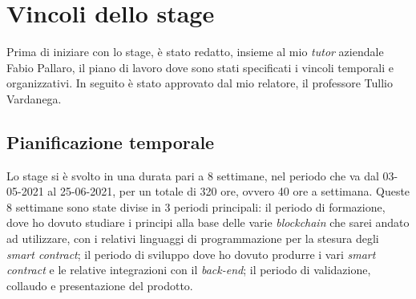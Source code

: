 
\section{Vincoli dello stage}
Prima di iniziare con lo stage, è stato redatto, insieme al mio \textit{tutor} aziendale Fabio Pallaro, il piano di lavoro dove sono stati specificati i vincoli temporali e organizzativi. In seguito è stato approvato dal mio relatore, il professore Tullio Vardanega.

\subsection{Pianificazione temporale}
Lo stage si è svolto in una durata pari a 8 settimane, nel periodo che va dal 03-05-2021 al 25-06-2021, per un totale di 320 ore, ovvero 40 ore a settimana. Queste 8 settimane sono state divise in 3 periodi principali: il periodo di formazione, dove ho dovuto studiare i principi alla base delle varie \textit{blockchain} che sarei andato ad utilizzare, con i relativi linguaggi di programmazione per la stesura degli \textit{smart contract}; il periodo di sviluppo dove ho dovuto produrre i vari \textit{smart contract} e le relative integrazioni con il \textit{back-end}; il periodo di validazione, collaudo e presentazione del prodotto. \\

